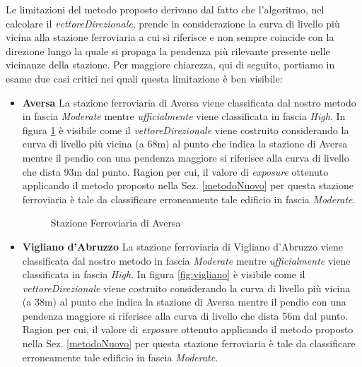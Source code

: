 Le limitazioni del metodo proposto derivano dal fatto che l'algoritmo, nel calcolare il \textit{vettoreDirezionale}, prende in considerazione la curva di livello più vicina alla stazione ferroviaria a cui si riferisce e non sempre coincide con la direzione lungo la quale si propaga la pendenza più rilevante presente nelle vicinanze della stazione. Per maggiore chiarezza, qui di seguito, portiamo in esame due casi critici nei quali questa limitazione è ben visibile:
\begin{itemize}
\item \textbf{Aversa}
\newline La stazione ferroviaria di Aversa viene classificata dal nostro metodo in fascia \textit{Moderate} mentre \textit{ufficialmente} viene classificata in fascia \textit{High}. In figura \ref{fig:aversa} è visibile come il  \textit{vettoreDirezionale} viene costruito considerando la curva di livello più vicina (a 68m) al punto che indica la stazione di Aversa mentre il pendio con una pendenza maggiore si riferisce alla curva di livello che dista 93m dal punto. Ragion per cui, il valore di \textit{exposure} ottenuto applicando il metodo proposto nella Sez. \ref{metodoNuovo} per questa stazione ferroviaria è tale da classificare erroneamente tale edificio in fascia \textit{Moderate}. 
\newpage
\begin{figure}[bth]
\myfloatalign
{} \quad
{} 
\caption[]{Stazione Ferroviaria di Aversa}\label{fig:aversa}
\end{figure}
\item \textbf{Vigliano d'Abruzzo}
\newline La stazione ferroviaria di Vigliano d'Abruzzo viene classificata dal nostro metodo in fascia \textit{Moderate} mentre \textit{ufficialmente} viene classificata in fascia \textit{High}. In figura \ref{fig:vigliano} è visibile come il  \textit{vettoreDirezionale} viene costruito considerando la curva di livello più vicina (a 38m) al punto che indica la stazione di Aversa mentre il pendio con una pendenza maggiore si riferisce alla curva di livello che dista 56m dal punto. Ragion per cui, il valore di \textit{exposure} ottenuto applicando il metodo proposto nella Sez. \ref{metodoNuovo} per questa stazione ferroviaria è tale da classificare erroneamente tale edificio in fascia \textit{Moderate}. 


\end{itemize}
